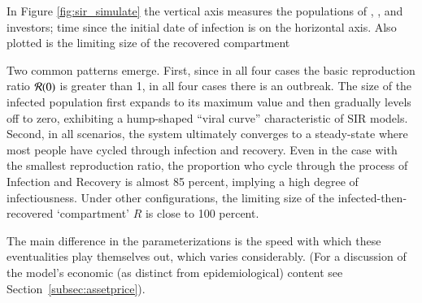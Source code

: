 In Figure \ref{fig:sir_simulate} the vertical axis measures the populations of {\Susceptible}, {\Infected}, and {\Recovered} investors; time since the initial date of infection is on the horizontal axis.  Also plotted is the limiting size of the recovered compartment %

Two common patterns emerge.  First, since in all four cases the basic reproduction ratio $\Rzero$ is greater than 1, in all four cases there is an outbreak. The size of the infected population first expands to its maximum value and then gradually levels off to zero, exhibiting a hump-shaped ``viral curve'' characteristic of SIR models.  Second, in all scenarios, the system ultimately converges to a steady-state where most people have cycled through infection and recovery. Even in the case with the smallest reproduction ratio, the proportion who cycle through the process of Infection and Recovery is almost 85 percent, implying a high degree of infectiousness. Under other configurations, the limiting size of the infected-then-recovered `compartment' $R$ is close to 100 percent.

The main difference in the parameterizations is the speed with which these eventualities play themselves out, which varies considerably.  (For a discussion of the model's economic (as distinct from epidemiological) content see Section~\ref{subsec:assetprice}).


